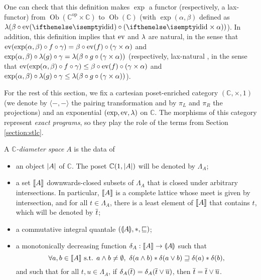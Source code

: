 One can check that this definition makes $\exp$ a functor (respectively, a lax-functor) from $\operatorname{Ob}(\mathbb{C}^{\operatorname{op}} \times \mathbb{C})$ to $\operatorname{Ob}(\mathbb{C})$ (with
$\exp(\alpha,\beta)$ defined as $\lam(\beta\circ\ev(\id)\circ(\id\times\alpha))$). In addition, this definition implies that $\operatorname{ev}$ and $\lambda$ are natural, in the sense that $\operatorname{ev}(\exp(\alpha,\beta)\circ f\circ\gamma) = \beta\circ\operatorname{ev}(f)\circ(\gamma\times\alpha)$ and $\exp(\alpha,\beta)\circ\lambda(g)\circ\gamma = \lambda(\beta\circ g\circ(\gamma\times\alpha))$ (respectively, lax-natural \cite{hilken:2-lambda}, in the sense that $\operatorname{ev}(\exp(\alpha,\beta)\circ f\circ\gamma) \leq \beta\circ\operatorname{ev}(f)\circ(\gamma\times\alpha)$ and $\exp(\alpha,\beta)\circ\lambda(g)\circ\gamma \leq \lambda(\beta\circ g\circ(\gamma\times\alpha))$).

For the rest of this section, we fix a cartesian poset-enriched category $(\mathbb{C}, \times, 1)$ (we denote by $\langle-,-\rangle$ the pairing transformation and by $\pi_L$ and $\pi_R$ the projections) and an exponential $(\exp, \operatorname{ev}, \lambda)$ on $\mathbb{C}$. The morphisms of this category represent \emph{exact programs}, so they play the role of the terms from Section \ref{section:stlc}.

\begin{definition} A \emph{$\mathbb{C}$-diameter space} $A$ is the data of \begin{itemize}
\item an object $\left\vert A\right\vert$ of $\mathbb{C}$. The poset $\mathbb{C}(1,\left\vert A\right\vert)$ will be denoted by $\Lambda_A$;
\item a set $\llbracket A \rrbracket$ downwards-closed subsets of $\Lambda_A$ that is closed under arbitrary intersections. In particular, $\llbracket A \rrbracket$ is a complete lattice whose meet is given by intersection, and for all $t\in\Lambda_A$, there is a least element of $\llbracket A \rrbracket$ that contains $t$, which will be denoted by $\overline{t}$;
\item a commutative integral quantale $(\llparenthesis A \rrparenthesis, \mathbin{\ast}, \sqsubseteq)$;
\item a monotonically decreasing function $\delta_A : \llbracket A \rrbracket \to \llparenthesis A \rrparenthesis$ such that $$\forall a,b \in \llbracket A \rrbracket \text{ s.t. } a \wedge b \neq \emptyset,~ \delta(a \wedge b) \mathbin{\ast} \delta(a \vee b) \sqsupseteq \delta(a) \mathbin{\ast} \delta(b)\text{,}$$
and such that for all $t,u \in \Lambda_A$, if $\delta_A(\overline{t}) = \delta_A(\overline{t} \vee \overline{u})$, then $\overline{t} = \overline{t} \vee \overline{u}$.
\end{itemize}
\end{definition}

